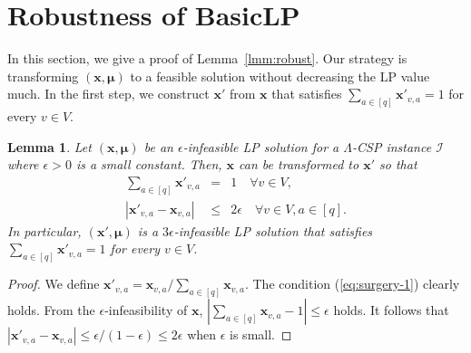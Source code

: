 \documentclass[letterpaper, 11pt]{article}
\newtheorem{lemma}[theorem]{Lemma}
\newcommand{\calI}{\mathcal{I}}
\newcommand{\bix}{\boldsymbol{x}}
\newcommand{\bimu}{\boldsymbol{\mu}}
\newcommand{\blp}{\textsf{BasicLP}\xspace}
\begin{document}
\section{Robustness of \blp}\label{apx:robust}
In this section, we give a proof of Lemma~\ref{lmm:robust}.
Our strategy is transforming $(\bix,\bimu)$ to a feasible solution without decreasing the LP value much.
In the first step,
we construct $\bix'$ from $\bix$ that satisfies $\sum_{a\in [q]}\bix'_{v,a}=1$ for every $v\in V$.
\begin{lemma}\label{lmm:surgery}
  Let $(\bix,\bimu)$ be an $\epsilon$-infeasible LP solution for a $\Lambda$-CSP instance $\calI$ where $\epsilon>0$ is a small constant.
  Then, $\bix$ can be transformed to $\bix'$ so that
  \begin{eqnarray}
    \sum_{a\in[q]}\bix'_{v,a}&=&1 \quad \forall v\in V, \label{eq:surgery-1}\\
    |\bix'_{v,a}-\bix_{v,a}| &\leq& 2\epsilon \quad \forall v\in V, a\in [q]. \label{eq:surgery-2}
  \end{eqnarray}
  In particular, 
  $(\bix',\bimu)$ is a $3\epsilon$-infeasible LP solution that satisfies $\sum_{a\in [q]}\bix'_{v,a}=1$ for every $v\in V$.
\end{lemma}
\begin{proof}
  We define $\bix'_{v,a}=\bix_{v,a}/\sum_{a\in [q]}\bix_{v,a}$.
  The condition (\ref{eq:surgery-1}) clearly holds.
  From the $\epsilon$-infeasibility of $\bix$, 
  $|\sum_{a\in [q]} \bix_{v,a}-1|\leq \epsilon $ holds.
  It follows that $|\bix'_{v,a}-\bix_{v,a}|\leq \epsilon/(1-\epsilon) \leq 2\epsilon$ when $\epsilon$ is small.
\end{proof}
\end{document}

